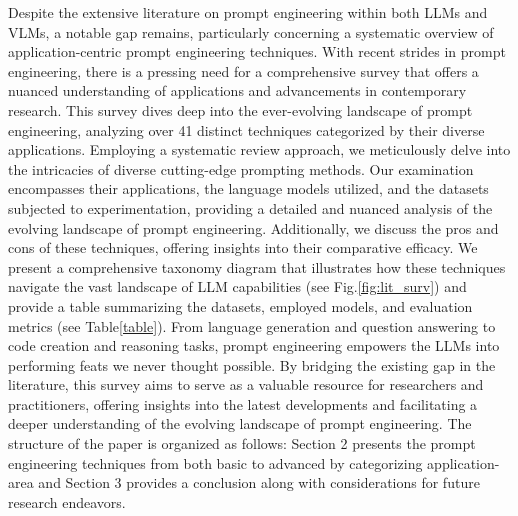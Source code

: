 \documentclass{article}
\begin{document}
Despite the extensive literature on prompt engineering within both LLMs and VLMs, a notable gap remains, particularly concerning a systematic overview of application-centric prompt engineering techniques. With recent strides in prompt engineering, there is a pressing need for a comprehensive survey that offers a nuanced understanding of applications and advancements in contemporary research. This survey dives deep into the ever-evolving landscape of prompt engineering, analyzing over 41 distinct techniques categorized by their diverse applications. Employing a systematic review approach, we meticulously delve into the intricacies of diverse cutting-edge prompting methods. Our examination encompasses their applications, the language models utilized, and the datasets subjected to experimentation, providing a detailed and nuanced analysis of the evolving landscape of prompt engineering. Additionally, we discuss the pros and cons of these techniques, offering insights into their comparative efficacy.
We present a comprehensive taxonomy diagram that illustrates how these techniques navigate the vast landscape of LLM capabilities (see Fig.\ref{fig:lit_surv}) and provide a table summarizing the datasets, employed models, and evaluation metrics (see Table\ref{table}). From language generation and question answering to code creation and reasoning tasks, prompt engineering empowers the LLMs into performing feats we never thought possible. By bridging the existing gap in the literature, this survey aims to serve as a valuable resource for researchers and practitioners, offering insights into the latest developments and facilitating a deeper understanding of the evolving landscape of prompt engineering. The structure of the paper is organized as follows: Section 2 presents the prompt engineering techniques from both basic to advanced by categorizing application-area and Section 3 provides a conclusion along with considerations for future research endeavors. 
\end{document}
